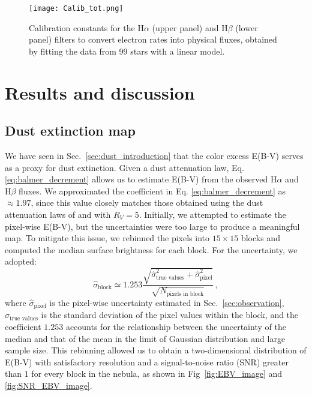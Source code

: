 \documentclass[fleqn,usenatbib]{mnras}
\begin{document}
\begin{figure}\centering
	\texttt{[image: Calib\_tot.png]}
    \caption{Calibration constants for the H$\alpha$ (upper panel) and H$\beta$ (lower panel) filters to convert electron rates into physical fluxes, obtained by fitting the data from 99 stars with a linear model.}
    \label{fig:Calib_tot}
\end{figure}



\section{Results and discussion}\label{sec:results}
\subsection{Dust extinction map}\label{sec:dust_results}
We have seen in Sec.~\ref{sec:dust_introduction} that the color excess E(B-V) serves as a proxy for dust extinction.
Given a dust attenuation law, Eq. \ref{eq:balmer_decrement} allows us to estimate E(B-V) from the observed H$\alpha$ and H$\beta$ fluxes.
We approximated the coefficient in Eq. \ref{eq:balmer_decrement} as $\approx 1.97$, since this value closely matches those obtained using the dust attenuation laws of \cite{Calzetti_2000} and \cite{Cardelli_1989} with $R_V = 5$.
Initially, we attempted to estimate the pixel-wise E(B-V), but the uncertainties were too large to produce a meaningful map.
To mitigate this issue, we rebinned the pixels into $15 \times 15$ blocks and computed the median surface brightness for each block.
For the uncertainty, we adopted:
\begin{equation}
  \hat{\sigma}_\text{block} \simeq 1.253 \dfrac{\sqrt{\hat{\sigma}_\text{true values}^2 + \hat{\sigma}_\text{pixel}^2}}{\sqrt{N_\text{pixels in block}}} \, ,
  \label{eq:rebinning_uncertainty}
\end{equation}
where $\hat{\sigma}_\text{pixel}$ is the pixel-wise uncertainty estimated in Sec.~\ref{sec:observation}, $\hat{\sigma}_\text{true values}$ is the standard deviation of the pixel values within the block, and the coefficient $1.253$ accounts for the relationship between the uncertainty of the median and that of the mean in the limit of Gaussian distribution and large sample size. 
This rebinning allowed us to obtain a two-dimensional distribution of E(B-V) with satisfactory resolution and a signal-to-noise ratio (SNR) greater than $1$ for every block in the nebula, as shown in Fig~\ref{fig:EBV_image} and \ref{fig:SNR_EBV_image}.
\smallskip
\end{document}
